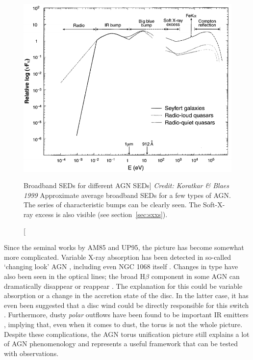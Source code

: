 \nocite{elvis1994}
\begin{figure}
\centering
\includegraphics[width=1.0\textwidth]{figures/01-intro/agn_sed.png}
\caption
[Broadband SEDs for different AGN SEDs]
{
{\sl Credit: Koratkar \& Blaes 1999}
Approximate average broadband SEDs for a few types of AGN. The series of 
characteristic bumps can be clearly seen. 
The Soft-X-ray excess is also visible
(see section~\ref{sec:sxxs}).
} 
\label{fig:quasar_sed}
\end{figure}

Since the seminal works by AM85 and UP95, 
the picture has become somewhat more complicated. 
Variable X-ray absorption has been detected in so-called `changing look'
AGN \citep{matt2003,puccetti2007},
including even NGC 1068 itself \citep{marinucci2016}.
Changes in type have also been seen in the optical lines;
the broad H$\beta$ component in some AGN can dramatically disappear or reappear
\citep[e.g.][]{tohline1976,cohen1986,denney2014}. 
The explanation for this could be variable absorption \citep{elitzur2012}
or a change in the accretion state of the disc. In the latter case,
it has even been suggested that a disc wind could be directly responsible
for this switch \citep{elitzur2014}.
 Furthermore, dusty {\em polar} outflows
have been found to be important IR emitters \citep{hoenig2013}, implying
that, even when it comes to dust, the torus is not the whole picture.
Despite these complications, the AGN torus unification picture still
explains a lot of AGN phenomenology and represents a useful framework 
that can be tested with observations. 


